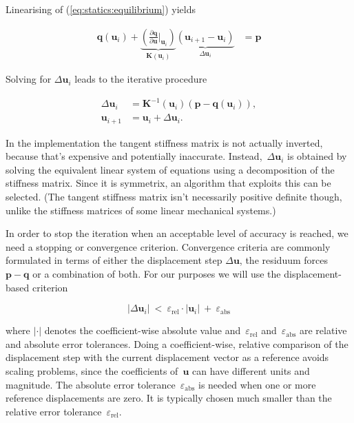 Linearising of (\ref{eq:statics:equilibrium}) yields

\begin{align}
\boldsymbol{q}(\boldsymbol{u}_i) +
\underbrace{
\left(\frac{\partial \boldsymbol{q}}{\partial \boldsymbol{u}}\bigg \vert_{\boldsymbol{u}_i}\right)
}_{\boldsymbol{K}(\boldsymbol{u}_i)}
\underbrace{
(\boldsymbol{u}_{i+1} - \boldsymbol{u}_i)
}_{\Delta\boldsymbol{u}_i} &= \boldsymbol{p}
\end{align}

Solving for $\Delta\boldsymbol{u}_i$ leads to the iterative procedure

\begin{align}
\Delta\boldsymbol{u}_i &= \boldsymbol{K}^{-1}(\boldsymbol{u}_i)\left(\boldsymbol{p} - \boldsymbol{q}(\boldsymbol{u}_i)\right),\\
\boldsymbol{u}_{i+1} &= \boldsymbol{u}_i + \Delta\boldsymbol{u}_i.\label{eq:statics:newton_iteration}
\end{align}

In the implementation the tangent stiffness matrix is not actually inverted, because that's expensive and potentially inaccurate. Instead,~$\Delta\boldsymbol{u}_i$ is obtained by solving the equivalent linear system of equations using a decomposition of the stiffness matrix.
Since it is symmetrix, an algorithm that exploits this can be selected.
(The tangent stiffness matrix isn't necessarily positive definite though, unlike the stiffness matrices of some linear mechanical systems.)

In order to stop the iteration when an acceptable level of accuracy is reached, we need a stopping or convergence criterion.
Convergence criteria are commonly formulated in terms of either the displacement step $\Delta\boldsymbol{u}$, the residuum forces $\boldsymbol{p} - \boldsymbol{q}$ or a combination of both.
For our purposes we will use the displacement-based criterion

\begin{equation}
| \Delta\boldsymbol{u}_{i} | \ < \ \varepsilon_{\mathrm{rel}} \cdot | \boldsymbol{u}_{i} | \ + \ \varepsilon_{\mathrm{abs}}\label{eq:convergence_basic}
\end{equation}

where $| \cdot |$ denotes the coefficient-wise absolute value and~$\varepsilon_{\mathrm{rel}}$ and~$\varepsilon_{\mathrm{abs}}$ are relative and absolute error tolerances.
Doing a coefficient-wise, relative comparison of the displacement step with the current displacement vector as a reference avoids scaling problems, since the coefficients of~$\boldsymbol{u}$ can have different units and magnitude.
The absolute error tolerance~$\varepsilon_{\mathrm{abs}}$ is needed when one or more reference displacements are zero.
It is typically chosen much smaller than the relative error tolerance~$\varepsilon_{\mathrm{rel}}$.

